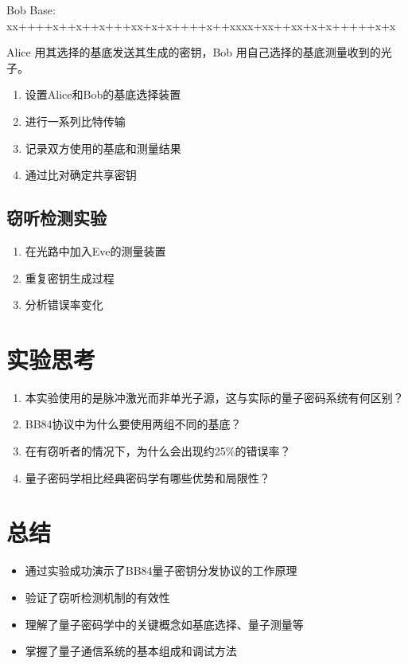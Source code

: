 \documentclass{ctexart}
\begin{document}
    Bob Base:   xx++++x++x++x+++xx+x+x++++x++xxxx+xx++xx+x+x+++++x+x

Alice 用其选择的基底发送其生成的密钥，Bob 用自己选择的基底测量收到的光子。
\begin{enumerate}
\item 设置Alice和Bob的基底选择装置
\item 进行一系列比特传输
\item 记录双方使用的基底和测量结果
\item 通过比对确定共享密钥
\end{enumerate}

\subsection{窃听检测实验}
\begin{enumerate}
\item 在光路中加入Eve的测量装置
\item 重复密钥生成过程
\item 分析错误率变化
\end{enumerate}

\section{实验思考}
\begin{enumerate}
\item 本实验使用的是脉冲激光而非单光子源，这与实际的量子密码系统有何区别？
\item BB84协议中为什么要使用两组不同的基底？
\item 在有窃听者的情况下，为什么会出现约25\%的错误率？
\item 量子密码学相比经典密码学有哪些优势和局限性？
\end{enumerate}

\section{总结}
\begin{itemize}
\item 通过实验成功演示了BB84量子密钥分发协议的工作原理
\item 验证了窃听检测机制的有效性
\item 理解了量子密码学中的关键概念如基底选择、量子测量等
\item 掌握了量子通信系统的基本组成和调试方法
\end{itemize}
\end{document}
